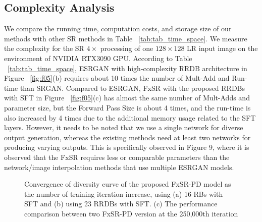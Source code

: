 \documentclass{article}
\begin{document}
\subsection{Complexity Analysis}
We compare the running time, computation costs, and storage size of our methods with other SR methods in Table ~\ref{tab:tab_time_space}. We measure the complexity for the SR $4\times$ processing of one ${128}\times{128}$ LR input image on the environment of NVIDIA RTX3090 GPU. According to Table ~\ref{tab:tab_time_space}, ESRGAN with high-complexity RRDB architecture in Figure ~\ref{fig:f05}(b) requires about 10 times the number of Mult-Add and Run-time than SRGAN. Compared to ESRGAN, FxSR with the proposed RRDBs with SFT in Figure ~\ref{fig:f05}(c) has almost the same number of Mult-Adds and parameter size, but the Forward Pass Size is about 4 times, and the run-time is also increased by 4 times due to the additional memory usage related to the SFT layers. However, it needs to be noted that we use a single network for diverse output generation, whereas the existing methods need at least two networks for producing varying outputs. This is specifically observed in Figure 9, where it is observed that the FxSR requires less or comparable parameters than the network/image interpolation methods that use multiple ESRGAN models.
\begin{figure*}[!t]
\centering
\scriptsize
\begin{minipage}[t]{1.0\linewidth}
    \centering
    \hfill
{}\hfill
    \hfill
    \hfill
    \hfill
\end{minipage}
\caption{Convergence of diversity curve of the proposed FxSR-PD model as the number of training iteration increase, using (a) 16 RBs with SFT and (b) using 23 RRDBs with SFT. (c) The performance comparison between two FxSR-PD version at the 250,000th iteration}
\label{fig:fig_div_graph_ab}
\end{figure*}
\end{document}
